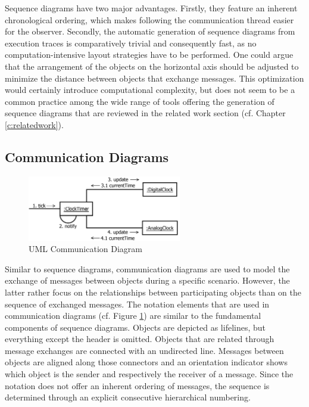 Sequence diagrams have two major advantages.
Firstly, they feature an inherent chronological ordering, which makes following the communication thread easier for the observer.
Secondly, the automatic generation of sequence diagrams from execution traces is comparatively trivial and consequently fast, as no computation-intensive layout strategies have to be performed.
One could argue that the arrangement of the objects on the horizontal axis should be adjusted to minimize the distance between objects that exchange messages.
This optimization would certainly introduce computational complexity, but does not seem to be a common practice among the wide range of tools offering the generation of sequence diagrams that are reviewed in the related work section (cf. Chapter \ref{c:relatedwork}).

\subsection{Communication Diagrams}
\label{ss:BackgroundModelingCommunication}

\begin{figure}
	\centering
	\includegraphics[width=0.6\textwidth]{../images/02-Communication}
	\caption[TOC Caption]{UML Communication Diagram}
	\label{fig:BackgroundModelingCommunication}
\end{figure}

Similar to sequence diagrams, communication diagrams \cite{rumbaugh_unified_2010} are used to model the exchange of messages between objects during a specific scenario.
However, the latter rather focus on the relationships between participating objects than on the sequence of exchanged messages.
The notation elements that are used in communication diagrams (cf. Figure \ref{fig:BackgroundModelingCommunication}) are similar to the fundamental components of sequence diagrams.
Objects are depicted as lifelines, but everything except the header is omitted.
Objects that are related through message exchanges are connected with an undirected line.
Messages between objects are aligned along those connectors and an orientation indicator shows which object is the sender and respectively the receiver of a message.
Since the notation does not offer an inherent ordering of messages, the sequence is determined through an explicit consecutive hierarchical numbering.

